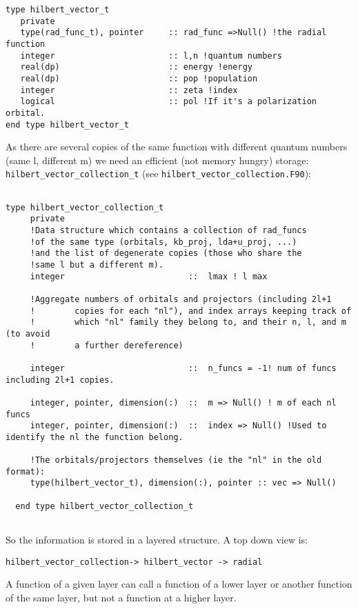 \documentclass[12pt]{article}
\begin{document}
\begin{verbatim}
type hilbert_vector_t
   private
   type(rad_func_t), pointer     :: rad_func =>Null() !the radial function
   integer                       :: l,n !quantum numbers
   real(dp)                      :: energy !energy
   real(dp)                      :: pop !population
   integer                       :: zeta !index
   logical                       :: pol !If it's a polarization orbital.
end type hilbert_vector_t
\end{verbatim}

As there are several copies of the same function with different quantum numbers (same l, different m)
we need an efficient (not memory hungry) storage:  \verb+hilbert_vector_collection_t+ (see \verb+hilbert_vector_collection.F90+):

\begin{verbatim}

type hilbert_vector_collection_t
     private
     !Data structure which contains a collection of rad_funcs
     !of the same type (orbitals, kb_proj, lda+u_proj, ...)
     !and the list of degenerate copies (those who share the
     !same l but a different m).
     integer                         ::  lmax ! l max
      
     !Aggregate numbers of orbitals and projectors (including 2l+1
     !        copies for each "nl"), and index arrays keeping track of
     !        which "nl" family they belong to, and their n, l, and m (to avoid
     !        a further dereference)

     integer                         ::  n_funcs = -1! num of funcs including 2l+1 copies.

     integer, pointer, dimension(:)  ::  m => Null() ! m of each nl funcs
     integer, pointer, dimension(:)  ::  index => Null() !Used to identify the nl the function belong.
    
     !The orbitals/projectors themselves (ie the "nl" in the old format):
     type(hilbert_vector_t), dimension(:), pointer :: vec => Null()
     
  end type hilbert_vector_collection_t
  
\end{verbatim}

So the information is stored in a layered structure. A top down view is:

\verb+hilbert_vector_collection-> hilbert_vector -> radial+

A function of a given layer can call a function of a lower layer or another function
of the same layer, but not a function at a higher layer.
\end{document}
